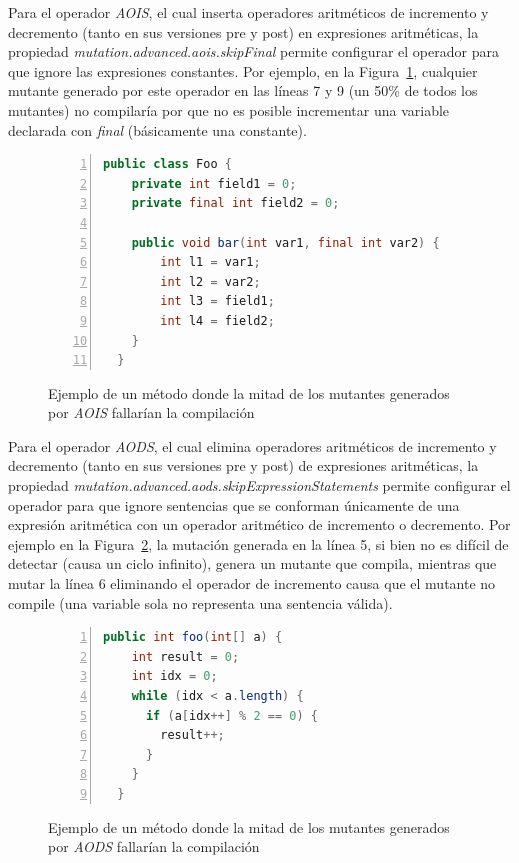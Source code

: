 Para el operador \emph{AOIS}, el cual inserta operadores aritm\'eticos de incremento y decremento (tanto en sus versiones pre y post) en expresiones aritm\'eticas, la propiedad \emph{mutation.advanced.aois.skipFinal} permite configurar el operador para que ignore las expresiones constantes. Por ejemplo, en la Figura~\ref{figures.examples.operators.aois}, cualquier mutante generado por este operador en las l\'ineas 7 y 9 (un 50\% de todos los mutantes) no compilar\'ia por que no es posible incrementar una variable declarada con \emph{final} (b\'asicamente una constante).

\begin{figure}
	\begin{lstlisting}[frame=single, numbers=left, mathescape=true,language=Java,basicstyle={},framexleftmargin=.073\textwidth,xleftmargin=.085\textwidth,xrightmargin=0.012\textwidth]
  public class Foo {
    private int field1 = 0;
    private final int field2 = 0;
    
    public void bar(int var1, final int var2) {
    	int l1 = var1;
    	int l2 = var2;
    	int l3 = field1;
    	int l4 = field2;
    }
  }
	\end{lstlisting}
	\caption[Ejemplo de mutantes \emph{AOIS} inv\'alidos]{Ejemplo de un m\'etodo donde la mitad de los mutantes generados por \emph{AOIS} fallar\'ian la compilaci\'on}
	\label{figures.examples.operators.aois}
\end{figure}

Para el operador \emph{AODS}, el cual elimina operadores aritm\'eticos de incremento y decremento (tanto en sus versiones pre y post) de expresiones aritm\'eticas, la propiedad \emph{mutation.advanced.aods.skipExpressionStatements} permite configurar el operador para que ignore sentencias que se conforman \'unicamente de una expresi\'on aritm\'etica con un operador aritm\'etico de incremento o decremento. Por ejemplo en la Figura~\ref{figures.examples.operators.aods}, la mutaci\'on generada en la l\'inea 5, si bien no es dif\'icil de detectar (causa un ciclo infinito), genera un mutante que compila, mientras que mutar la l\'inea 6 eliminando el operador de incremento causa que el mutante no compile (una variable sola no representa una sentencia v\'alida).

\begin{figure}
	\begin{lstlisting}[frame=single, numbers=left, mathescape=true,language=Java,basicstyle={},framexleftmargin=.073\textwidth,xleftmargin=.085\textwidth,xrightmargin=0.012\textwidth]
  public int foo(int[] a) {
    int result = 0;
    int idx = 0;
    while (idx < a.length) {
      if (a[idx++] % 2 == 0) {
        result++;
      }
    }
  }
	\end{lstlisting}
	\caption[Ejemplo de mutantes \emph{AODS} inv\'alidos]{Ejemplo de un m\'etodo donde la mitad de los mutantes generados por \emph{AODS} fallar\'ian la compilaci\'on}
	\label{figures.examples.operators.aods}
\end{figure}

